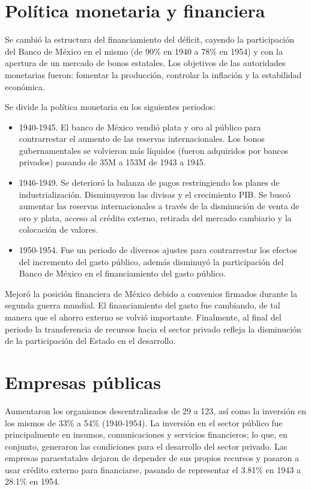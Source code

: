 \section{Política monetaria y financiera}
Se cambió la estructura del financiamiento del déficit, cayendo la participación del Banco de México en el mismo (de 90\% en 1940 a 78\% en 1954) y con la apertura de un mercado de bonos estatales. Los objetivos de las autoridades monetarias fueron: fomentar la producción, controlar la inflación y la estabilidad económica.

Se divide la política monetaria en los siguientes periodos:
\begin{itemize}
    \item 1940-1945. El banco de México vendió plata y oro al público para contrarrestar el aumento de las reservas internacionales. Los bonos gubernamentales se volvieron más líquidos (fueron adquiridos por bancos privados) pasando de 35M a 153M de 1943 a 1945.
    \item 1946-1949. Se deterioró la balanza de pagos restringiendo los planes de industrialización. Disminuyeron las divisas y el crecimiento PIB. Se buscó aumentar las reservas internacionales a través de la disminución de venta de oro y plata, acceso al crédito externo, retirada del mercado cambiario y la colocación de valores.
    \item 1950-1954. Fue un periodo de diversos ajustes para contrarrestar los efectos del incremento del gasto público, además disminuyó la participación del Banco de México en el financiamiento del gasto público.
\end{itemize}

Mejoró la posición financiera de México debido a convenios firmados durante la segunda guerra mundial. El financiamiento del gasto fue cambiando, de tal manera que el ahorro externo se volvió importante. Finalmente, al final del periodo la transferencia de recursos hacia el sector privado refleja la disminución de la participación del Estado en el desarrollo.

\section{Empresas públicas}
Aumentaron los organismos descentralizados de 29 a 123, así como la inversión en los mismos de 33\% a 54\% (1940-1954). La inversión en el sector público fue principalmente en insumos, comunicaciones y servicios financieros; lo que, en conjunto, generaron las condiciones para el desarrollo del sector privado. Las empresas paraestatales dejaron de depender de sus propios recursos y pasaron a usar crédito externo para financiarse, pasando de representar el 3.81\% en 1943 a 28.1\% en 1954.

